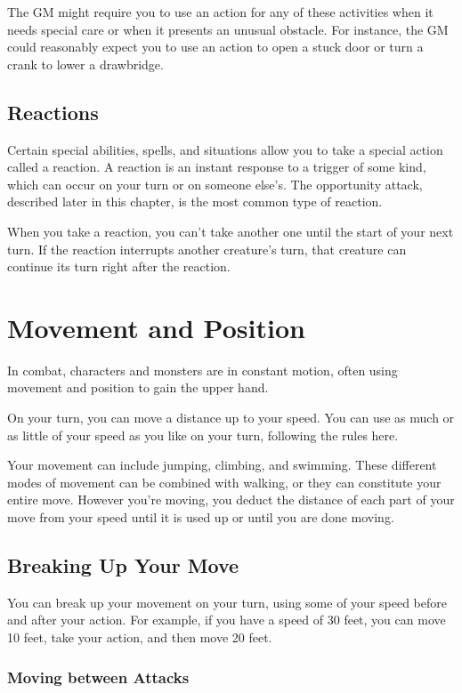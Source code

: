 The GM might require you to use an action for any of these activities when it needs special care or when it presents an unusual obstacle. For instance, the GM could reasonably expect you to use an action to open a stuck door or turn a crank to lower a drawbridge.

\subsection{Reactions}

Certain special abilities, spells, and situations allow you to take a special action called a reaction. A reaction is an instant response to a trigger of some kind, which can occur on your turn or on someone else's. The opportunity attack, described later in this chapter, is the most common type of reaction.

When you take a reaction, you can't take another one until the start of your next turn. If the reaction interrupts another creature's turn, that creature can continue its turn right after the reaction.

\section{Movement and Position}
\label{sec:movement-and-position}

In combat, characters and monsters are in constant motion, often using movement and position to gain the upper hand.

On your turn, you can move a distance up to your speed. You can use as much or as little of your speed as you like on your turn, following the rules here.

Your movement can include jumping, climbing, and swimming. These different modes of movement can be combined with walking, or they can constitute your entire move. However you're moving, you deduct the distance of each part of your move from your speed until it is used up or until you are done moving.

\subsection{Breaking Up Your Move}

You can break up your movement on your turn, using some of your speed before and after your action. For example, if you have a speed of 30 feet, you can move 10 feet, take your action, and then move 20 feet.

\subsubsection{Moving between Attacks}

